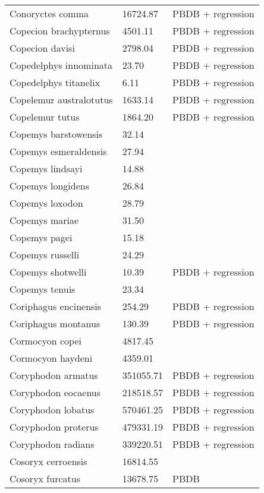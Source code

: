 \begin{center}
\begin{longtable}{p{} p{} p{} }
  Conoryctes comma & 16724.87 & PBDB + regression \\ 
  Copecion brachypternus & 4501.11 & PBDB + regression \\ 
  Copecion davisi & 2798.04 & PBDB + regression \\ 
  Copedelphys innominata & 23.70 & PBDB + regression \\ 
  Copedelphys titanelix & 6.11 & PBDB + regression \\ 
  Copelemur australotutus & 1633.14 & PBDB + regression \\ 
  Copelemur tutus & 1864.20 & PBDB + regression \\ 
  Copemys barstowensis & 32.14 & \cite{Tomiya2013} \\ 
  Copemys esmeraldensis & 27.94 & \cite{Tomiya2013} \\ 
  Copemys lindsayi & 14.88 & \cite{Tomiya2013} \\ 
  Copemys longidens & 26.84 & \cite{Tomiya2013} \\ 
  Copemys loxodon & 28.79 & \cite{Tomiya2013} \\ 
  Copemys mariae & 31.50 & \cite{Tomiya2013} \\ 
  Copemys pagei & 15.18 & \cite{Tomiya2013} \\ 
  Copemys russelli & 24.29 & \cite{Tomiya2013} \\ 
  Copemys shotwelli & 10.39 & PBDB + regression \\ 
  Copemys tenuis & 23.34 & \cite{Tomiya2013} \\ 
  Coriphagus encinensis & 254.29 & PBDB + regression \\ 
  Coriphagus montanus & 130.39 & PBDB + regression \\ 
  Cormocyon copei & 4817.45 & \cite{Tomiya2013} \\ 
  Cormocyon haydeni & 4359.01 & \cite{Tomiya2013} \\ 
  Coryphodon armatus & 351055.71 & PBDB + regression \\ 
  Coryphodon eocaenus & 218518.57 & PBDB + regression \\ 
  Coryphodon lobatus & 570461.25 & PBDB + regression \\ 
  Coryphodon proterus & 479331.19 & PBDB + regression \\ 
  Coryphodon radians & 339220.51 & PBDB + regression \\ 
  Cosoryx cerroensis & 16814.55 & \cite{Tomiya2013} \\ 
  Cosoryx furcatus & 13678.75 & PBDB \\ 

\end{longtable}
\end{center}
